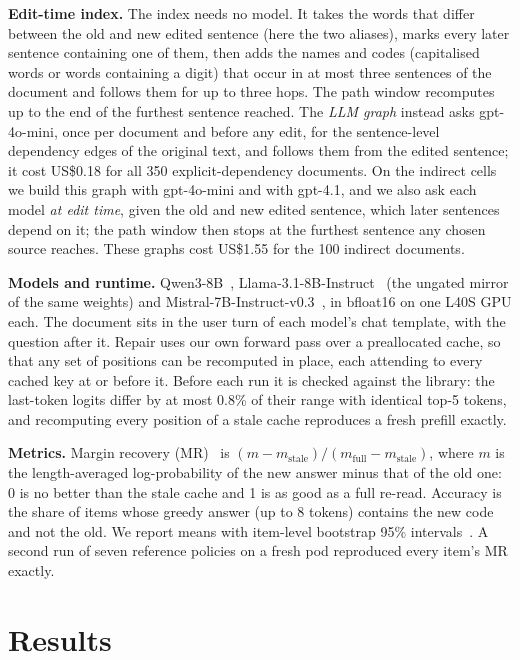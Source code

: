 \documentclass[conference]{IEEEtran}
\begin{document}
\textbf{Edit-time index.} The index needs no model. It takes the words that differ between the old and new
edited sentence (here the two aliases), marks every later sentence containing one of them, then adds the
names and codes (capitalised words or words containing a digit) that occur in at most three sentences of the
document and follows them for up to three hops. The path window recomputes up to the end of the furthest
sentence reached. The \emph{LLM graph} instead asks gpt-4o-mini, once per document and before any edit, for
the sentence-level dependency edges of the original text, and follows them from the edited sentence; it cost
US\$0.18 for all 350 explicit-dependency documents. On the indirect cells we build this graph with gpt-4o-mini
and with gpt-4.1, and we also ask each model \emph{at edit time}, given the old and new edited sentence, which
later sentences depend on it; the path window then stops at the furthest sentence any chosen source reaches.
These graphs cost US\$1.55 for the 100 indirect documents.

\textbf{Models and runtime.} Qwen3-8B~\cite{qwen2025qwen3}, Llama-3.1-8B-Instruct~\cite{dubey2024llama3} (the
ungated mirror of the same weights) and Mistral-7B-Instruct-v0.3~\cite{jiang2023mistral}, in bfloat16 on one
L40S GPU each. The document sits in the user turn of each model's chat template, with the question after it.
Repair uses our own forward pass over a preallocated cache, so that any set of positions can be recomputed in
place, each attending to every cached key at or before it. Before each run it is checked against the library:
the last-token logits differ by at most 0.8\% of their range with identical top-5 tokens, and recomputing
every position of a stale cache reproduces a fresh prefill exactly.

\textbf{Metrics.} Margin recovery (MR)~\cite{mao2026contiguity} is $(m - m_\text{stale}) / (m_\text{full} -
m_\text{stale})$, where $m$ is the length-averaged log-probability of the new answer minus that of the old
one: 0 is no better than the stale cache and 1 is as good as a full re-read. Accuracy is the share of items
whose greedy answer (up to 8 tokens) contains the new code and not the old. We report means with item-level
bootstrap 95\% intervals~\cite{efron1993bootstrap}. A second run of seven reference policies on a fresh pod
reproduced every item's MR exactly.

\section{Results}
\label{sec:results}
\end{document}
